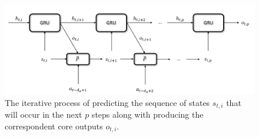                 \begin{figure}
                    \centering
                    \includegraphics[width=15cm, keepaspectratio]{images/dmdp/modelbased_ssbm.png}
                    \caption{The iterative process of predicting the sequence of states $s_{t, i}$ that will occur in the next $p$ steps along with producing the correspondent core outputs $o_{t, i}$.}
                    \label{fig:modelbased_ssbm}
                \end{figure}
                
